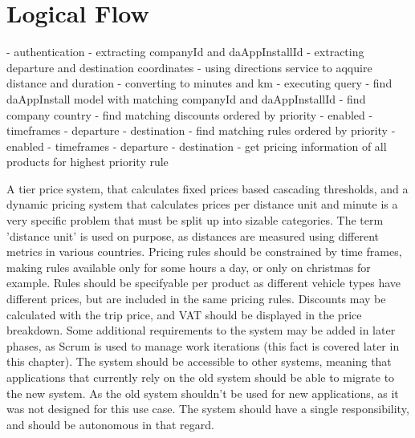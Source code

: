 %
\section{Logical Flow}

- authentication
- extracting companyId and daAppInstallId
- extracting departure and destination coordinates
- using directions service to aqquire distance and duration
	- converting to minutes and km
- executing query
	- find daAppInstall model with matching companyId and daAppInstallId
	- find company country
	- find matching discounts ordered by priority
	  - enabled
		- timeframes
		- departure
		- destination
	- find matching rules ordered by priority
	  - enabled
		- timeframes
		- departure
		- destination
	- get pricing information of all products for highest priority rule













A tier price system, that calculates fixed prices based cascading thresholds, and a dynamic pricing system that calculates prices per distance unit and minute is a very specific problem that must be split up into sizable categories. The term 'distance unit' is used on purpose, as distances are measured using different metrics in various countries. Pricing rules should be constrained by time frames, making rules available only for some hours a day, or only on christmas for example. Rules should be specifyable per product as different vehicle types have different prices, but are included in the same pricing rules. Discounts may be calculated with the trip price, and VAT should be displayed in the price breakdown. Some additional requirements to the system may be added in later phases, as Scrum is used to manage work iterations (this fact is covered later in this chapter). The system should be accessible to other systems, meaning that applications that currently rely on the old system should be able to migrate to the new system. As the old system shouldn't be used for new applications, as it was not designed for this use case. The system should have a single responsibility, and should be autonomous in that regard.